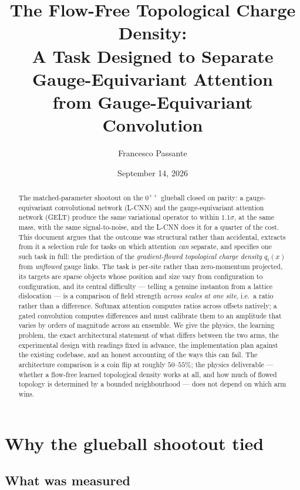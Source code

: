 \documentclass[11pt,a4paper]{article}
\title{The Flow-Free Topological Charge Density:\\
A Task Designed to Separate Gauge-Equivariant Attention\\
from Gauge-Equivariant Convolution}
\author{Francesco Passante}
\date{September 14, 2026}
\newcommand{\qflow}{q_{t}}
\begin{document}
\maketitle

\begin{abstract}
The matched-parameter shootout on the $0^{++}$ glueball closed on parity: a
gauge-equivariant convolutional network (L-CNN) and the gauge-equivariant
attention network (GELT) produce the same variational operator to within
$1.1\sigma$, at the same mass, with the same signal-to-noise, and the L-CNN does
it for a quarter of the cost. This document argues that the outcome was
structural rather than accidental, extracts from it a selection rule for tasks on
which attention \emph{can} separate, and specifies one such task in full: the
prediction of the \emph{gradient-flowed topological charge density} $\qflow(x)$
from \emph{unflowed} gauge links. The task is per-site rather than
zero-momentum projected, its targets are sparse objects whose position and size
vary from configuration to configuration, and its central difficulty --- telling
a genuine instanton from a lattice dislocation --- is a comparison of field
strength \emph{across scales at one site}, i.e.\ a ratio rather than a
difference. Softmax attention computes ratios across offsets natively; a gated
convolution computes differences and must calibrate them to an amplitude that
varies by orders of magnitude across an ensemble. We give the physics, the
learning problem, the exact architectural statement of what differs between the
two arms, the experimental design with readings fixed in advance, the
implementation plan against the existing codebase, and an honest accounting of
the ways this can fail. The architecture comparison is a coin flip at roughly
$50$--$55\%$; the physics deliverable --- whether a flow-free learned
topological density works at all, and how much of flowed topology is determined
by a bounded neighbourhood --- does not depend on which arm wins.
\end{abstract}

\tableofcontents

\section{Why the glueball shootout tied}

\subsection{What was measured}
\end{document}
